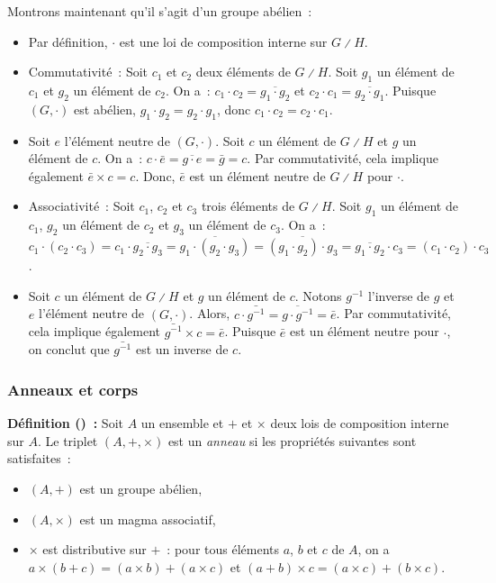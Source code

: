     Montrons maintenant qu'il s'agit d'un groupe abélien : 
    \begin{itemize}[nosep]
        \item Par définition, $\cdot$ est une loi de composition interne sur $G \divslash H$.
        \item Commutativité : Soit $c_1$ et $c_2$ deux éléments de $G \divslash H$.
            Soit $g_1$ un élément de $c_1$ et $g_2$ un élément de $c_2$. 
            On a : $c_1 \cdot c_2 = \overline{g_1 \cdot g_2}$ et $c_2 \cdot c_1 = \overline{g_2 \cdot g_1}$.
            Puisque $(G, \cdot)$ est abélien, $g_1 \cdot g_2 = g_2 \cdot g_1$, donc $c_1 \cdot c_2 = c_2 \cdot c_1$.
        \item Soit $e$ l'élément neutre de $(G, \cdot)$. 
            Soit $c$ un élément de $G \divslash H$ et $g$ un élément de $c$. 
            On a : $c \cdot \bar{e} = \overline{g \cdot e} = \bar{g} = c$.
            Par commutativité, cela implique également $\bar{e} \times c = c$.
            Donc, $\bar{e}$ est un élément neutre de $G \divslash H$ pour $\cdot$.
        \item Associativité : Soit $c_1$, $c_2$ et $c_3$ trois éléments de $G \divslash H$.
            Soit $g_1$ un élément de $c_1$, $g_2$ un élément de $c_2$ et $g_3$ un élément de $c_3$.
            On a : $c_1 \cdot (c_2 \cdot c_3) = c_1 \cdot \overline{g_2 \cdot g_3} = \overline{g_1 \cdot (g_2 \cdot g_3)} = \overline{(g_1 \cdot g_2) \cdot g_3} = \overline{g_1 \cdot g_2} \cdot c_3 = (c_1 \cdot c_2) \cdot c_3$.
        \item Soit $c$ un élément de $G \divslash H$ et $g$ un élément de $c$. 
            Notons $g^{-1}$ l'inverse de $g$ et $e$ l'élément neutre de $(G,\cdot)$. 
            Alors, $c \cdot \bar{g^{-1}} = \overline{g \cdot g^{-1}} = \bar{e}$.
            Par commutativité, cela implique également $\bar{g^{-1}} \times c = \bar{e}$.
            Puisque $\bar{e}$ est un élément neutre pour $\cdot$, on conclut que $\bar{g^{-1}}$ est un inverse de $c$.
    \end{itemize}

    \done

\subsubsection{Anneaux et corps}

\noindent\textbf{Définition () :} Soit $A$ un ensemble et $+$ et $\times$ deux lois de composition interne sur $A$. 
    Le triplet $(A, +, \times)$ est un \textit{anneau} si les propriétés suivantes sont satisfaites : 
    \begin{itemize}[nosep]
        \item $(A,+)$ est un groupe abélien,
        \item $(A, \times)$ est un magma associatif,
        \item $\times$ est distributive sur $+$ : pour tous éléments $a$, $b$ et $c$ de $A$, on a $a \times (b + c) = (a \times b) + (a \times c)$ et $(a + b) \times c = (a \times c) + (b \times c)$.
    \end{itemize}

